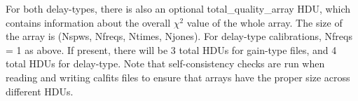 \documentclass[11pt, oneside]{article}   	%
\begin{document}
For both delay-types, there is also an optional total\_quality\_array HDU, which
contains information about the overall $\chi^2$ value of the whole array. The
size of the array is (Nspws, Nfreqs, Ntimes, Njones). For delay-type
calibrations, Nfreqs = 1 as above. If present, there will be 3 total HDUs for
gain-type files, and 4 total HDUs for delay-type. Note that self-consistency
checks are run when reading and writing calfits files to ensure that arrays have
the proper size across different HDUs.
\end{document}
